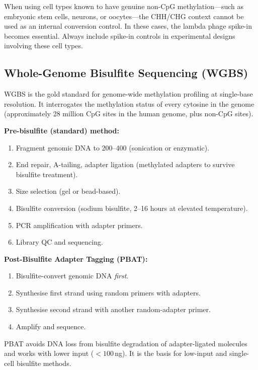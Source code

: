 \begin{tipbox}
When using cell types known to have genuine non-CpG methylation---such as embryonic stem cells, neurons, or oocytes---the CHH/CHG context cannot be used as an internal conversion control. In these cases, the lambda phage spike-in becomes essential. Always include spike-in controls in experimental designs involving these cell types.
\end{tipbox}

\subsection{Whole-Genome Bisulfite Sequencing (WGBS)}
\label{subsec:methylation:wgbs}

\acrfull{WGBS} is the gold standard for genome-wide methylation profiling at single-base resolution. It interrogates the methylation status of every cytosine in the genome (approximately 28 million CpG sites in the human genome, plus non-CpG sites).

\begin{protocolbox}[title={WGBS Library Preparation}]
\textbf{Pre-bisulfite (standard) method:}
\begin{enumerate}[itemsep=1pt]
  \item Fragment genomic DNA to 200--400\basepair{} (sonication or enzymatic).
  \item End repair, A-tailing, adapter ligation (methylated adapters to survive bisulfite treatment).
  \item Size selection (gel or bead-based).
  \item Bisulfite conversion (sodium bisulfite, 2--16 hours at elevated temperature).
  \item PCR amplification with adapter primers.
  \item Library QC and sequencing.
\end{enumerate}

\textbf{Post-Bisulfite Adapter Tagging (PBAT):}
\begin{enumerate}[itemsep=1pt]
  \item Bisulfite-convert genomic DNA \textit{first}.
  \item Synthesise first strand using random primers with adapters.
  \item Synthesise second strand with another random-adapter primer.
  \item Amplify and sequence.
\end{enumerate}
PBAT avoids DNA loss from bisulfite degradation of adapter-ligated molecules and works with lower input ($< 100$\,ng). It is the basis for low-input and single-cell bisulfite methods.
\end{protocolbox}

